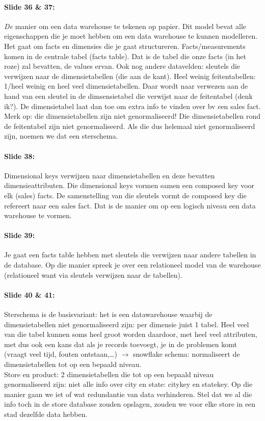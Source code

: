 \documentclass[10pt,a4paper]{report}
\begin{document}
\paragraph{Slide 36 \& 37:}\emph{De} manier om een data warehouse te tekenen op papier. Dit model bevat alle eigenschappen die je moet hebben om een data warehouse te kunnen modelleren. Het gaat om facts en dimensies die je gaat structureren. Facts/measurements komen in de centrale tabel (facts table). Dat is de tabel die onze facts (in het roze) zal bevatten, de values ervan. Ook nog andere datavelden: sleutels die verwijzen naar de dimensietabellen (die aan de kant). Heel weinig feitentabellen: 1/heel weinig en heel veel dimensietabellen. Daar wordt naar verwezen aan de hand van een sleutel in de dimsensietabel die verwijst naar de feitentabel (denk ik?). De dimensietabel laat dan toe om extra info te vinden over bv een sales fact. \\
Merk op: die dimensietabellen zijn niet genormaliseerd! Die dimensietabellen rond de feitentabel zijn niet genormaliseerd. Als die dus helemaal niet genormaliseerd zijn, noemen we dat een sterschema.

\paragraph{Slide 38:}Dimensional keys verwijzen naar dimensietabellen en deze bevatten dimensieattributen. Die dimensional keys vormen samen een composed key voor elk (sales) facts. De samenstelling van die sleutels vormt de composed key die refereert naar een sales fact. Dat is de manier om op een logisch niveau een data warehouse te vormen.

\paragraph{Slide 39:}Je gaat een facts table hebben met sleutels die verwijzen naar andere tabellen in de database. Op die manier spreek je over een relationeel model van de warehouse (relationeel want via sleutels verwijzen naar de tabellen).

\paragraph{Slide 40 \& 41:}Sterschema is de basisvariant: het is een datawarehouse waarbij de dimensietabellen niet genormaliseerd zijn: per dimensie juist 1 tabel. Heel veel van die tabel kunnen soms heel groot worden daardoor, met heel veel attributen, met dus ook een kans dat als je records toevoegt, je in de problemen komt (vraagt veel tijd, fouten ontstaan,…) $\rightarrow$ snowflake schema: normaliseert de dimensietabellen tot op een bepaald niveau.\\
Store en product: 2 dimensietabellen die tot op een bepaald niveau genormaliseerd zijn: niet alle info over city en state: citykey en statekey. Op die manier gaan we iet of wat redundantie van data verhinderen. Stel dat we al die info toch in de store database zouden opslagen, zouden we voor elke store in een stad dezelfde data hebben.
\end{document}
